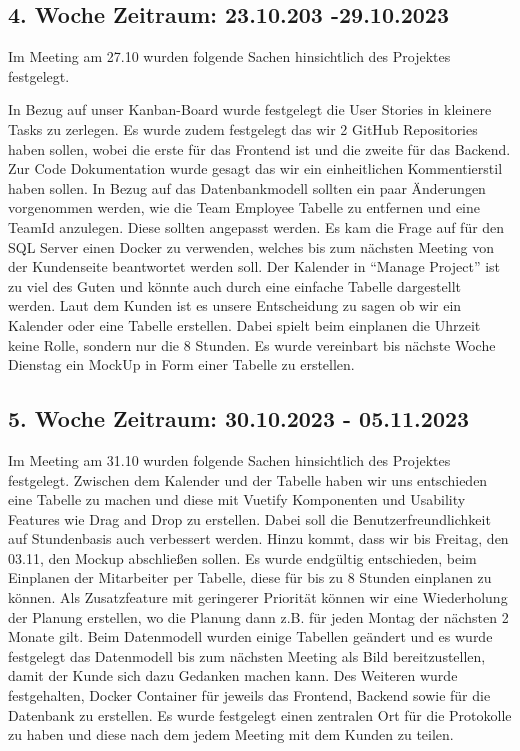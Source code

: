 \documentclass{article}
\begin{document}
\subsection{4. Woche Zeitraum: 23.10.203 -29.10.2023}
Im Meeting am 27.10 wurden folgende Sachen hinsichtlich des Projektes
festgelegt.

In Bezug auf unser Kanban-Board wurde festgelegt die User Stories in kleinere
Tasks zu zerlegen. Es wurde zudem festgelegt das wir 2 GitHub Repositories
haben sollen, wobei die erste für das Frontend ist und die zweite für das
Backend. Zur Code Dokumentation wurde gesagt das wir ein einheitlichen
Kommentierstil haben sollen. In Bezug auf das Datenbankmodell sollten ein paar
Änderungen vorgenommen werden, wie die Team Employee Tabelle zu entfernen und
eine TeamId anzulegen. Diese sollten angepasst werden. Es kam die Frage auf für
den SQL Server einen Docker zu verwenden, welches bis zum nächsten Meeting von
der Kundenseite beantwortet werden soll. Der Kalender in “Manage Project” ist
zu viel des Guten und könnte auch durch eine einfache Tabelle dargestellt
werden. Laut dem Kunden ist es unsere Entscheidung zu sagen ob wir ein Kalender
oder eine Tabelle erstellen. Dabei spielt beim einplanen die Uhrzeit keine
Rolle, sondern nur die 8 Stunden. Es wurde vereinbart bis nächste Woche
Dienstag ein MockUp in Form einer Tabelle zu erstellen.

\subsection{5. Woche Zeitraum: 30.10.2023 - 05.11.2023}
Im Meeting am 31.10 wurden folgende Sachen hinsichtlich des Projektes
festgelegt. Zwischen dem Kalender und der Tabelle haben wir uns entschieden
eine Tabelle zu machen und diese mit Vuetify Komponenten und Usability Features
wie Drag and Drop zu erstellen. Dabei soll die Benutzerfreundlichkeit auf
Stundenbasis auch verbessert werden. Hinzu kommt, dass wir bis Freitag, den
03.11, den Mockup abschließen sollen. Es wurde endgültig entschieden, beim
Einplanen der Mitarbeiter per Tabelle, diese für bis zu 8 Stunden einplanen zu
können. Als Zusatzfeature mit geringerer Priorität können wir eine Wiederholung
der Planung erstellen, wo die Planung dann z.B. für jeden Montag der nächsten 2
Monate gilt. Beim Datenmodell wurden einige Tabellen geändert und es wurde
festgelegt das Datenmodell bis zum nächsten Meeting als Bild bereitzustellen,
damit der Kunde sich dazu Gedanken machen kann. Des Weiteren wurde
festgehalten, Docker Container für jeweils das Frontend, Backend sowie für die
Datenbank zu erstellen. Es wurde festgelegt einen zentralen Ort für die
Protokolle zu haben und diese nach dem jedem Meeting mit dem Kunden zu teilen.
\end{document}
